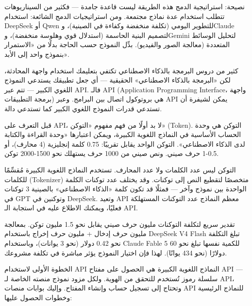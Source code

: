 \begin{tcbinfo}{نصيحة: استراتيجية الدمج}
هذه الطريقة ليست قاعدة جامدة — فكثير من السيناريوهات تتطلب استخدام عدة نماذج مجتمعة. ومن استراتيجيات الدمج الشائعة: استخدام DeepSeek أو Qwen للتطوير اليومي (تكلفة منخفضة وكفاءة في الصينية)، وClaude لتصميم البنية الحاسمة (استدلال قوي وهلوسة منخفضة)، وGemini لتحليل الوسائط المتعددة (معالجة الصور والفيديو). بدِّل النموذج حسب الحاجة بدلًا من «الاستمرار بنموذج واحد إلى الأبد».

\end{tcbinfo}


كثير من دروس البرمجة بالذكاء الاصطناعي تكتفي بتعليمك استخدام واجهة المحادثة، لكن «البرمجة بالذكاء الاصطناعي» الحقيقية — أي جعل تطبيقك يستدعي النموذج اللغوي الكبير — تتم عبر API. فالـ API (Application Programming Interface، واجهة برمجة التطبيقات) هي بروتوكول اتصال بين البرامج. وعبر API يمكن لشيفرة أن تستدعي قدرات النموذج اللغوي الكبير كما تستدعي دالة.


قبل التعرف على API، لا بد أولًا من فهم مفهوم «التوكن» (Token). التوكن هي وحدة الحساب الأساسية في النماذج اللغوية الكبيرة، ويمكن اعتبارها «وحدة القراءة والكتابة لدى الذكاء الاصطناعي». التوكن الواحد يقابل تقريبًا: 0.75 كلمة إنجليزية (4 محارف)، أو 0.5-1 حرف صيني. ونص صيني من 1000 حرف يستهلك نحو 1500-2000 توكن.

التوكن ليس عدد الكلمات ولا عدد المحارف. تستخدم النماذج اللغوية الكبيرة مُقسِّمًا للكلمات (Tokenizer) متخصصًا لتقطيع النص إلى توكنات. وقد يختلف عدد توكنات الكلمة الواحدة بين نموذج وآخر — فمثلًا قد تكون كلمة «الذكاء الاصطناعي» بالصينية 3 توكنات في GPT وتوكنين في DeepSeek. وتعيد API معظم النماذج عدد التوكنات المستهلكة فعليًا، ويمكنك الاطلاع عليه في استجابة الـ API.

\begin{tcbinfo}{تقدير سريع لتكلفة التوكنات}
مليون حرف صيني يقابل نحو 1.5 مليون توكن. بمعالجة مليون حرف إدخال + مليون حرف إخراج باستخدام DeepSeek V4 Flash تبلغ التكلفة نحو 0.42 دولار (نحو 3 يوانات)، وباستخدام Claude Fable 5 للكمية نفسها تبلغ نحو 60 دولارًا (نحو 434 يوانًا). لهذا فإن اختيار النموذج يؤثر مباشرة في تكلفة مشروعك.

\end{tcbinfo}


الخطوة الأولى لاستخدام API النماذج اللغوية الكبيرة هي الحصول على مفتاح API — سلسلة رموز تُستخدم للتحقق من الهوية. ولكل مزود نموذج منصته الخاصة لـ API، وتحتاج إلى تسجيل حساب وإنشاء المفتاح. وإليك بوابات منصات API للنماذج الرئيسية وخطوات الحصول عليها:

